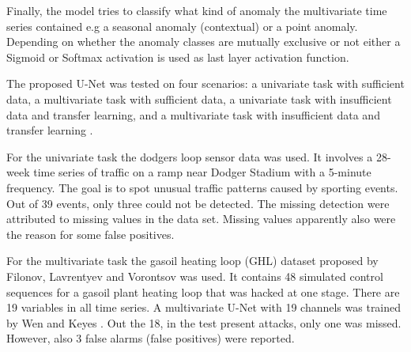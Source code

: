 Finally, the model tries to classify what kind of anomaly the multivariate time series contained e.g a seasonal anomaly (contextual) or a point anomaly. Depending on whether the anomaly classes are mutually exclusive or not either a Sigmoid or Softmax activation is used as last layer activation function.

The proposed U-Net was tested on four scenarios: a univariate task with sufficient data, a multivariate task with sufficient data, a univariate task with insufficient data and transfer learning, and a multivariate task with insufficient data and transfer learning \parencite{Wen2019}. 

For the univariate task the dodgers loop sensor data was used. It involves a 28-week time series of traffic on a ramp near Dodger Stadium with a 5-minute frequency. The goal is to spot unusual traffic patterns caused by sporting events. Out of 39 events, only three could not be detected. The missing detection were attributed to missing values in the data set. Missing values apparently also were the reason for some false positives.

For the multivariate task the gasoil heating loop (GHL) dataset proposed by Filonov, Lavrentyev and Vorontsov \parencite*{Filonov2016} was used. It contains 48 simulated control sequences for a gasoil plant heating loop that was hacked at one stage. There are 19 variables in all time series. A multivariate U-Net with 19 channels was trained by Wen and Keyes \parencite*{Wen2019}. Out the 18, in the test present attacks, only one was missed. However, also 3 false alarms (false positives) were reported. 


